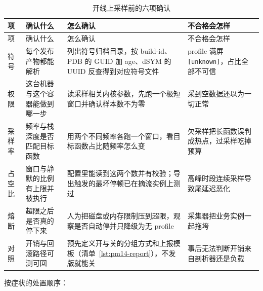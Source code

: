 \documentclass[12pt,a4paper,fontset=fandol]{ctexbook}
\newcommand{\Tp}[1]{\texttt{#1}}
\begin{document}
\begin{longtable}{>{\raggedright\arraybackslash}p{}>{\raggedright\arraybackslash}p{}>{\raggedright\arraybackslash}p{}>{\raggedright\arraybackslash}p{}}
\caption{开线上采样前的六项确认}\label{tab:pm14-checklist}\\
\toprule
项 & 确认什么 & 怎么确认 & 不合格会怎样 \\
\midrule
\endfirsthead
\toprule
项 & 确认什么 & 怎么确认 & 不合格会怎样 \\
\midrule
\endhead
\bottomrule
\endfoot
\bottomrule
\endlastfoot
符号 & 每个发布产物都能解析 & 列出符号归档目录，按 build-id、PDB 的 GUID 加 age、dSYM 的 UUID 反查得到对应符号文件 & profile 满屏 \Tp{[unknown]}，占比全部不可信 \\
权限 & 这台机器与这个容器能做到哪一步 & 读采样相关内核参数，先跑一个极短窗口并确认样本数不为零 & 采到空数据还以为一切正常 \\
采样率 & 频率与栈深度是否匹配目标函数 & 用两个不同频率各跑一个窗口，看目标函数占比随频率怎么变 & 欠采样把长函数误判成热点，过采样吃掉预算 \\
占空比 & 窗口与静默的比例有上限并被执行 & 配置里能读到这两个数并有校验；导出触发的最坏停顿已在摘流实例上测过 & 高峰时段连续采样导致尾延迟恶化 \\
熔断 & 超限之后是否真的停下来 & 人为把磁盘或内存限制压到超限，观察是否自动停并只降级为无 profile & 采集器把业务实例一起拖垮 \\
对照 & 开销与回滚路径可测可回 & 预先定义开与关的分组方式和上报模板（清单~\ref{lst:pm14-report}），不发版就能关 & 事后无法判断开销来自剖析器还是负载 \\
\end{longtable}

按症状的处置顺序：
\end{document}
